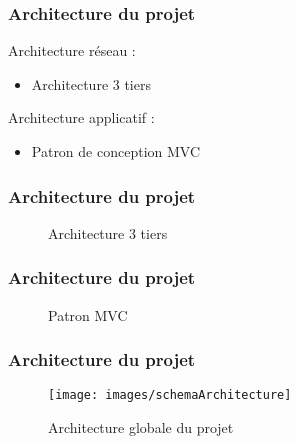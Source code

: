 \begin{frame}
  \frametitle{Architecture du projet}
	
  Architecture réseau :
      \begin{itemize}
        \item Architecture 3 tiers
      \end{itemize}
  Architecture applicatif :
      \begin{itemize}
        \item Patron de conception MVC
      \end{itemize}
\end{frame}

\begin{frame}
  \frametitle{Architecture du projet}

  
  \begin{figure}[!h]
	\begin{center}
	
	\caption{\label{3tiers_schema} Architecture 3 tiers}
	\end{center}
  \end{figure}

\end{frame}




\begin{frame}
  \frametitle{Architecture du projet}

  \begin{figure}[!h]
	\begin{center}
	
	\caption{\label{3tiers_schema} Patron MVC}
	\end{center}
  \end{figure}	
	
\end{frame}



\begin{frame}
  \frametitle{Architecture du projet}

  \begin{figure}[!h]
	\begin{center}
	\texttt{[image: images/schemaArchitecture]}
	\caption{\label{archi_schema} Architecture globale du projet}
	\end{center}
  \end{figure}	
	
\end{frame}